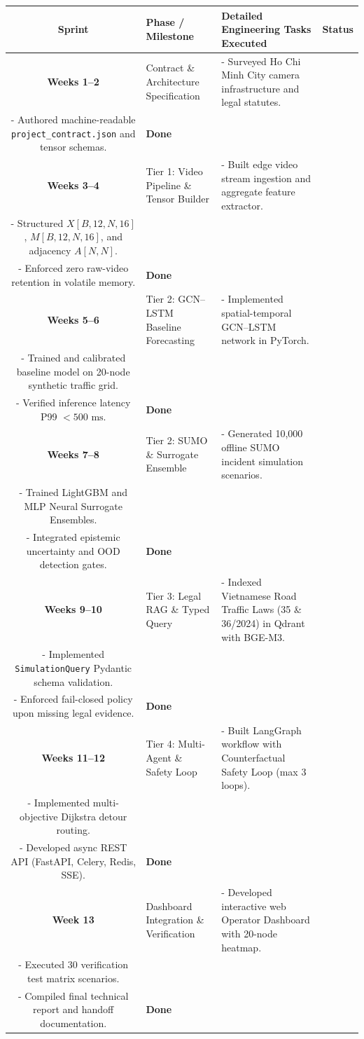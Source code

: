 \begin{longtable}{|c|p{3.8cm}|p{8.0cm}|c|}
\hline
\rowcolor{blue!10}
\textbf{Sprint} & \textbf{Phase / Milestone} & \textbf{Detailed Engineering Tasks Executed} & \textbf{Status} \\
\hline
\endhead

\textbf{Weeks 1--2} & 
Contract \& Architecture Specification & 
- Surveyed Ho Chi Minh City camera infrastructure and legal statutes.\\
- Authored machine-readable \texttt{project\_contract.json} and tensor schemas. & \textbf{Done} \\
\hline

\textbf{Weeks 3--4} & 
Tier 1: Video Pipeline \& Tensor Builder & 
- Built edge video stream ingestion and aggregate feature extractor.\\
- Structured $X[B,12,N,16]$, $M[B,12,N,16]$, and adjacency $A[N,N]$.\\
- Enforced zero raw-video retention in volatile memory. & \textbf{Done} \\
\hline

\textbf{Weeks 5--6} & 
Tier 2: GCN--LSTM Baseline Forecasting & 
- Implemented spatial-temporal GCN--LSTM network in PyTorch.\\
- Trained and calibrated baseline model on 20-node synthetic traffic grid.\\
- Verified inference latency P99 $< 500\text{ ms}$. & \textbf{Done} \\
\hline

\textbf{Weeks 7--8} & 
Tier 2: SUMO \& Surrogate Ensemble & 
- Generated 10,000 offline SUMO incident simulation scenarios.\\
- Trained LightGBM and MLP Neural Surrogate Ensembles.\\
- Integrated epistemic uncertainty and OOD detection gates. & \textbf{Done} \\
\hline

\textbf{Weeks 9--10} & 
Tier 3: Legal RAG \& Typed Query & 
- Indexed Vietnamese Road Traffic Laws (35 \& 36/2024) in Qdrant with BGE-M3.\\
- Implemented \texttt{SimulationQuery} Pydantic schema validation.\\
- Enforced fail-closed policy upon missing legal evidence. & \textbf{Done} \\
\hline

\textbf{Weeks 11--12} & 
Tier 4: Multi-Agent \& Safety Loop & 
- Built LangGraph workflow with Counterfactual Safety Loop (max 3 loops).\\
- Implemented multi-objective Dijkstra detour routing.\\
- Developed async REST API (FastAPI, Celery, Redis, SSE). & \textbf{Done} \\
\hline

\textbf{Week 13} & 
Dashboard Integration \& Verification & 
- Developed interactive web Operator Dashboard with 20-node heatmap.\\
- Executed 30 verification test matrix scenarios.\\
- Compiled final technical report and handoff documentation. & \textbf{Done} \\
\hline
\end{longtable}
